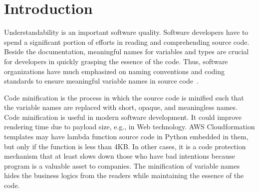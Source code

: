 \section{Introduction}
\label{intro:sec}

Understandability is an important software quality. Software
developers have to spend a significant portion of efforts in
reading and comprehending source code. Beside the documentation,
meaningful names for variables and types are crucial for developers in
quickly grasping the essence of the code. Thus, software organizations have
much emphasized on naming conventions and coding standards to ensure
meaningful variable names in source
code~\cite{barr-codeconvention-fse14}.



    Code minification is the process in which the source
    code is minified such that the variable names are replaced with
    short, opaque, and meaningless names. Code minification is useful
    in modern software development. It could improve rendering time
    due to payload size, e.g., in Web technology. AWS Cloudformation
    templates may have lambda function source code in Python embedded
    in them, but only if the function is less than 4KB. In other
    cases, it is a code protection mechanism that at least slows down
    those who have bad intentions because program is a valuable asset
    to companies. The minification of variable names hides the
    business logics from the readers while maintaining the essence of
    the code.



